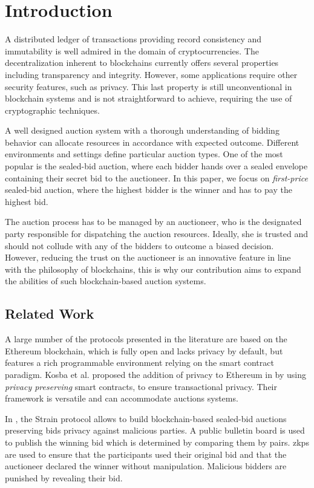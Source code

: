  \section{Introduction}%
\label{sec-Introduction}%

A distributed ledger of transactions providing record consistency and immutability is well admired in the domain of cryptocurrencies. The decentralization inherent to blockchains currently offers several properties including transparency and integrity. However, some applications require other security features, such as privacy. This last property is still unconventional in blockchain systems and is not straightforward to achieve, requiring the use of cryptographic techniques.

A well designed auction system with a thorough understanding of bidding behavior can allocate resources in accordance with expected outcome. Different environments and settings define particular auction types. One of the most popular is the sealed-bid auction, where each bidder hands over a sealed envelope containing their secret bid to the auctioneer. In this paper, we focus on \textit{first-price} sealed-bid auction, where the highest bidder is the winner and has to pay the highest bid.

The auction process has to be managed by an auctioneer, who is the designated party responsible for dispatching the auction resources. Ideally, she is trusted and should not collude with any of the bidders to outcome a biased decision. However, reducing the trust on the auctioneer is an innovative feature in line with the philosophy of blockchains, this is why our contribution aims to expand the abilities of such blockchain-based auction systems.

\subsection{Related Work}%
\label{subsec-related}%

A large number of the protocols presented in the literature are based on the Ethereum blockchain, which is fully open and lacks privacy by default, but features a rich programmable environment relying on the smart contract paradigm. Kosba et al. proposed the addition of privacy to Ethereum in \cite{kosba2016hawk} by using \textit{privacy preserving} smart contracts, to ensure transactional privacy. Their framework is versatile and can accommodate auctions systems.

In \cite{blass2018strain}, the Strain protocol allows to build blockchain-based sealed-bid auctions preserving bids privacy against malicious parties. A public bulletin board is used to publish the winning bid which is determined by comparing them by pairs. \glspl{zkp} are used to ensure that the participants used their original bid and that the auctioneer declared the winner without manipulation. Malicious bidders are punished by revealing their bid.

